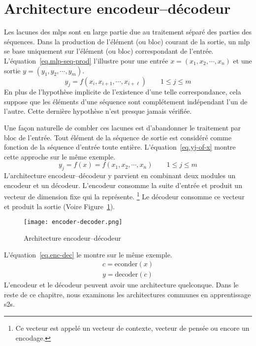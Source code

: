 \section{Architecture encodeur--décodeur}

Les lacunes des \glspl{mlp} sont en large partie due au traitement séparé des parties des séquences.
Dans la production de l'élément (ou bloc) courant de la sortie,
un \gls{mlp} se base uniquement sur l'élément (ou bloc) correspondant de l'entrée.
L'équation~\ref{eq.mlp-seq-prod} l'illustre pour une entrée \(x = (x_1, x_2, \cdots, x_n)\)
et une sortie \(y = (y_1, y_2, \cdots, y_m)\).
\begin{equation}
    \label{eq.mlp-seq-prod}
    y_j = f(x_i, x_{i+1}, \cdots, x_{i+\ell}) \qquad 1 \le j \le m
\end{equation}
En plus de l'hypothèse implicite de l'existence d'une telle correspondance,
cela suppose que les éléments d'une séquence sont complétement indépendant l'un de l'autre.
Cette dernière hypothèse n'est presque jamais vérifiée. 

Une façon naturelle de combler ces lacunes est d'abandonner le traitement par bloc de l'entrée.
Tout élément de la séquence de sortie est considéré comme fonction de la séquence d'entrée toute entière.
L'équation~\ref{eq.yj-of-x} montre cette approche sur le même exemple.  
\begin{equation}
    \label{eq.yj-of-x}
    y_j = f(x) = f(x_1, x_2, \cdots, x_n) \qquad 1 \le j \le m
\end{equation}
L'architecture encodeur--décodeur y parvient en combinant deux modules un encodeur et un décodeur.
L'encodeur consomme la suite d'entrée et produit un vecteur de dimension fixe qui la représente.
\footnote{Ce vecteur est appelé un vecteur de contexte, vecteur de pensée ou encore un encodage.}
Le décodeur consomme ce vecteur et produit la sortie (Voire Figure~\ref{fig.encoder-decoder}).
\begin{figure}[hbt]
    \centering
    \texttt{[image: encoder-decoder.png]}
    \caption{Architecture encodeur--décodeur}
    \label{fig.encoder-decoder}
\end{figure}
L'équation~\ref{eq.enc-dec} le montre sur le même exemple.
\begin{equation}
    \label{eq.enc-dec}
    \begin{array}{l}
        c = \mathrm{econder}(x)\\
        y = \mathrm{decoder}(c)
    \end{array}
\end{equation}
L'encodeur et le décodeur peuvent avoir une architecture quelconque.
Dans le reste de ce chapitre, nous examinons les architectures communes en apprentissage \gls{s2s}.


